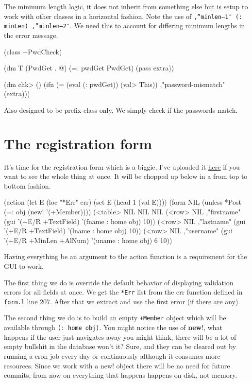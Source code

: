 The minimum length logic, it does not inherit from something else but
is setup to work with other classes in a horizontal fashion. Note the
use of \texttt{,”minlen--1″ (: minLen) ,”minlen--2″}. We need this to
account for differing minimum lengths in the error message.

\begin{wideverbatim}
(class +PwdCheck)

(dm T (PwdGet . @)
  (=: pwdGet PwdGet)
  (pass extra))

(dm chk> ()
  (ifn (= (eval (: pwdGet)) (val> This)) ,"password-mismatch" (extra)))
\end{wideverbatim}

Also designed to be prefix class only. We simply check if the passwords
match.


\section{The registration form}
\label{sec:registration-form}

It's time for the registration form which is a biggie, I've uploaded it
\href{http://www.prodevtips.com/wp-content/uploads/2008/08/reg-form.l}{here}
if you want to see the whole thing at once. It will be chopped up below
in a from top to bottom fashion.

\begin{wideverbatim}
(action
    (let E (loc "*Err" err) 
       (set E (head 1 (val E))))
    (form NIL
       (unless *Post (=: obj (new! '(+Member))))
       (<table> NIL NIL NIL
          (<row> NIL ,"firstname" (gui '(+E/R +TextField)   
                '(fname : home obj) 10))
          (<row> NIL ,"lastname"  (gui '(+E/R +TextField) 
                 '(lname : home obj) 10))
          (<row> NIL ,"username"  (gui '(+E/R +MinLen +AlNum) 
                 '(uname : home obj) 6 10))
\end{wideverbatim}

Having everything be an argument to the action function is a requirement
for the GUI to work.

The first thing we do is override the default behavior of displaying
validation errors for all fields at once. We get the \texttt{*Err}
list from the err function defined in \texttt{form.l} line 207. After
that we extract and use the first error (if there are any).

The second thing we do is to build an empty \texttt{+Member} object
which will be available through \texttt{(: home obj)}. You might
notice the use of \textbf{new}!, what happens if the user just
navigates away you might think, there will be a lot of empty bullshit
in the database won't it? Sure, and they can be cleared out by running
a cron job every day or continuously although it consumes more
resources. Since we work with a new! object there will be no need for
future commits, from now on everything that happens happens on disk,
not memory.

